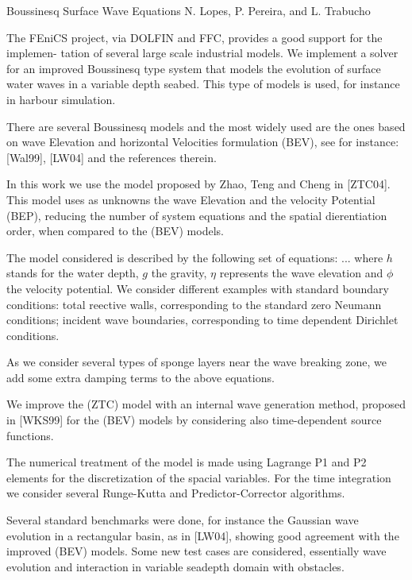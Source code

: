               {Boussinesq Surface Wave Equations}
              {N. Lopes, P. Pereira, and L. Trabucho}

\editornote{[lopes]}

The FEniCS project, via DOLFIN and FFC, provides a good support for
the implemen- tation of several large scale industrial models. We
implement a solver for an improved Boussinesq type system that models
the evolution of surface water waves in a variable depth seabed. This
type of models is used, for instance in harbour simulation.

There are several Boussinesq models and the most widely used are the
ones based on wave Elevation and horizontal Velocities formulation
(BEV), see for instance: [Wal99], [LW04] and the references therein.

In this work we use the model proposed by Zhao, Teng and Cheng in
[ZTC04]. This model uses as unknowns the wave Elevation and the
velocity Potential (BEP), reducing the number of system equations and
the spatial dierentiation order, when compared to the (BEV) models.

The model considered is described by the following set of equations:
...  where $h$ stands for the water depth, $g$ the gravity, $\eta$
represents the wave elevation and $\phi$ the velocity potential. We
consider different examples with standard boundary conditions: total
reective walls, corresponding to the standard zero Neumann conditions;
incident wave boundaries, corresponding to time dependent Dirichlet
conditions.

As we consider several types of sponge layers near the wave breaking
zone, we add some extra damping terms to the above equations.

We improve the (ZTC) model with an internal wave generation
method, proposed in [WKS99] for the (BEV) models by considering also
time-dependent source functions.

The numerical treatment of the model is made using Lagrange P1 and P2
elements for the discretization of the spacial variables. For the time
integration we consider several Runge-Kutta and Predictor-Corrector
algorithms.

Several standard benchmarks were done, for instance the Gaussian wave
evolution in a rectangular basin, as in [LW04], showing good agreement
with the improved (BEV) models. Some new test cases are considered,
essentially wave evolution and interaction in variable seadepth domain
with obstacles.
